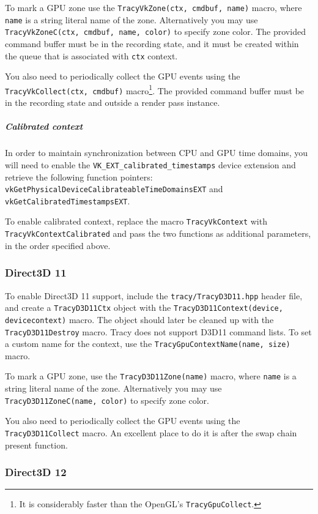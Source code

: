 \documentclass[hidelinks,titlepage,a4paper]{article}
\begin{document}
To mark a GPU zone use the \texttt{TracyVkZone(ctx, cmdbuf, name)} macro, where \texttt{name} is a string literal name of the zone. Alternatively you may use \texttt{TracyVkZoneC(ctx, cmdbuf, name, color)} to specify zone color. The provided command buffer must be in the recording state, and it must be created within the queue that is associated with \texttt{ctx} context.

You also need to periodically collect the GPU events using the \texttt{TracyVkCollect(ctx, cmdbuf)} macro\footnote{It is considerably faster than the OpenGL's \texttt{TracyGpuCollect}.}. The provided command buffer must be in the recording state and outside a render pass instance.

\subparagraph{Calibrated context}

In order to maintain synchronization between CPU and GPU time domains, you will need to enable the \texttt{VK\_EXT\_calibrated\_timestamps} device extension and retrieve the following function pointers: \texttt{vkGetPhysicalDeviceCalibrateableTimeDomainsEXT} and \texttt{vkGetCalibratedTimestampsEXT}.

To enable calibrated context, replace the macro \texttt{TracyVkContext} with \texttt{TracyVkContextCalibrated} and pass the two functions as additional parameters, in the order specified above.

\subsubsection{Direct3D 11}

To enable Direct3D 11 support, include the \texttt{tracy/TracyD3D11.hpp} header file, and create a \texttt{TracyD3D11Ctx} object with the \texttt{TracyD3D11Context(device, devicecontext)} macro. The object should later be cleaned up with the \texttt{TracyD3D11Destroy} macro. Tracy does not support D3D11 command lists. To set a custom name for the context, use the \texttt{TracyGpuContextName(name, size)} macro.

To mark a GPU zone, use the \texttt{TracyD3D11Zone(name)} macro, where \texttt{name} is a string literal name of the zone. Alternatively you may use \texttt{TracyD3D11ZoneC(name, color)} to specify zone color.

You also need to periodically collect the GPU events using the \texttt{TracyD3D11Collect} macro. An excellent place to do it is after the swap chain present function.

\subsubsection{Direct3D 12}
\end{document}
